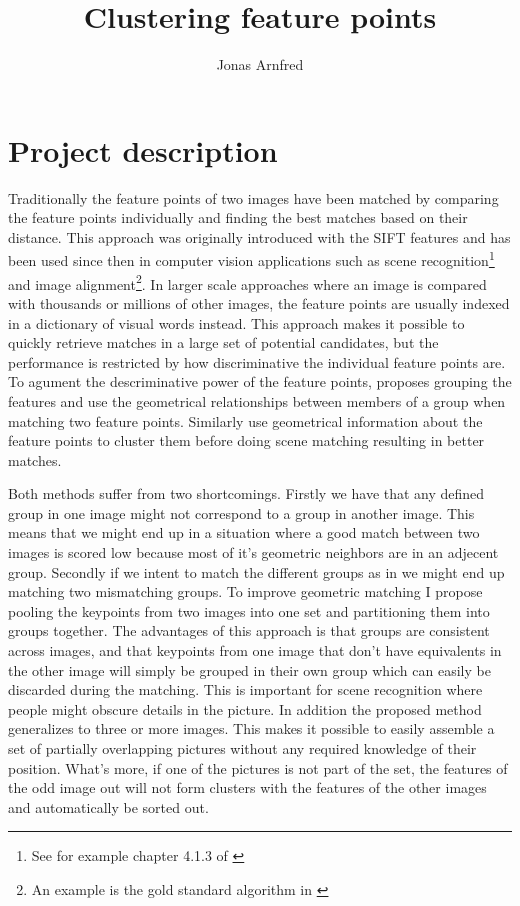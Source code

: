 \documentclass{article}
\begin{document}
\title{Clustering feature points}
\author{Jonas Arnfred}

\maketitle

\begin{abstract}
\end{abstract}

\section{Project description}

Traditionally the feature points of two images have been matched by 
comparing the feature points individually and finding the best matches 
based on their distance. This approach was originally introduced with 
the SIFT features \cite{lowe2004sift} and has been used since then in 
computer vision applications such as scene recognition\footnote{See for 
example chapter 4.1.3 of \cite[pp. 226]{szeliski2010}} and image 
alignment\footnote{An example is the gold standard algorithm in \cite[p.  
114]{multipleView}}. In larger scale approaches where an image is 
compared with thousands or millions of other images, the feature points 
are usually indexed in a dictionary of visual words instead. This 
approach makes it possible to quickly retrieve matches in a large set of 
potential candidates, but the performance is restricted by how 
discriminative the individual feature points are. To agument the 
descriminative power of the feature points, \cite{wu2009bundling} 
proposes grouping the features and use the geometrical relationships 
between members of a group when matching two feature points. Similarly 
\cite{das2008event} use geometrical information about the feature points 
to cluster them before doing scene matching resulting in better matches.

Both methods suffer from two shortcomings. Firstly we have that any 
defined group in one image might not correspond to a group in another 
image.  This means that we might end up in a situation where a good 
match between two images is scored low because most of it's geometric 
neighbors are in an adjecent group. Secondly if we intent to match the 
different groups as in \cite{wu2009bundling} we might end up matching 
two mismatching groups. To improve geometric matching I propose pooling 
the keypoints from two images into one set and partitioning them into 
groups together.  The advantages of this approach is that groups are 
consistent across images, and that keypoints from one image that don't 
have equivalents in the other image will simply be grouped in their own 
group which can easily be discarded during the matching. This is 
important for scene recognition where people might obscure details in 
the picture. In addition the proposed method generalizes to three or 
more images.  This makes it possible to easily assemble a set of 
partially overlapping pictures without any required knowledge of their 
position.  What's more, if one of the pictures is not part of the set, 
the features of the odd image out will not form clusters with the 
features of the other images and automatically be sorted out. 
\end{document}
